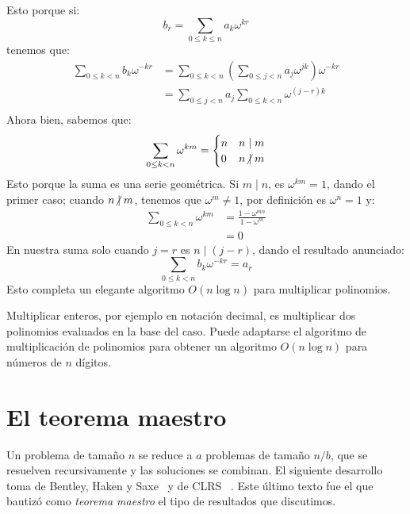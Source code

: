   Esto porque si:
  \begin{equation*}
    b_r
      = \sum_{0 \le k \le n} a_k \omega^{k r}
  \end{equation*}
  tenemos que:
  \begin{align*}
    \sum_{0 \le k < n} b_k \omega^{-k r}
      &= \sum_{0 \le k < n}
           \left(
             \sum_{0 \le j < n} a_j \omega^{j k}
           \right) \omega^{-k r} \\
      &= \sum_{0 \le j < n}
           a_j \sum_{0 \le k < n} \omega^{(j - r) k} \\
  \end{align*}
  Ahora bien,
  sabemos que:
  \begin{equation*}
    \sum_{0 \le k < n} \omega^{k m}
      = \begin{cases}
           n & n \mid m \\
           0 & n \centernot\mid m
        \end{cases}
  \end{equation*}
  Esto porque la suma es una serie geométrica.
  Si \(m \mid n\),
  es \(\omega^{k m} = 1\),
  dando el primer caso;
  cuando \(n \centernot\mid m\),
  tenemos que \(\omega^m \ne 1\),
  por definición es \(\omega^n = 1\) y:
  \begin{align*}
    \sum_{0 \le k < n} \omega^{k m}
      &= \frac{1 - \omega^{m n}}{1 - \omega^m} \\
      &= 0
  \end{align*}
  En nuestra suma solo cuando \(j = r\) es \(n \mid (j - r)\),
  dando el resultado anunciado:
  \begin{equation*}
    \sum_{0 \le k < n} b_k \omega^{-k r}
      = a_r
  \end{equation*}
  Esto completa un elegante algoritmo \(O(n \log n)\)
  para multiplicar polinomios.

  Multiplicar enteros,
  por ejemplo en notación decimal,
  es multiplicar dos polinomios evaluados en la base del caso.
  Puede adaptarse el algoritmo de multiplicación de polinomios
  para obtener un algoritmo \(O(n \log n)\) para números de \(n\) dígitos.

\section{El teorema maestro}
\label{sec:master-theorem}

  Un problema de tamaño \(n\) se reduce a \(a\) problemas de tamaño \(n / b\),
  que se resuelven recursivamente
  y las soluciones se combinan.
  El siguiente desarrollo toma de Bentley, Haken y Saxe~%
   \cite{bentley80:_master_theorem}
  y de CLRS~%
     \cite{cormen09:_CLRS}.
  Este último texto fue el que bautizó como \emph{teorema maestro}
  el tipo de resultados que discutimos.

